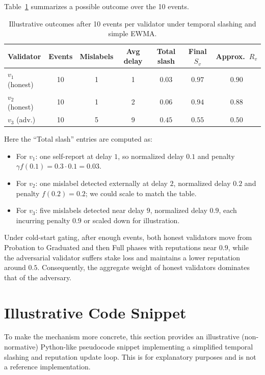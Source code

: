 \documentclass[11pt]{article}
\theoremstyle{plain}
\theoremstyle{definition}
\begin{document}
Table~\ref{tab:toy} summarizes a possible outcome over the 10 events.

\begin{table}[h]
\centering
\begin{tabular}{lcccccc}
\toprule
Validator & Events & Mislabels & Avg delay & Total slash & Final \(S_v\) & Approx.\ \(R_v\) \\
\midrule
\(v_1\) (honest) & 10 & 1 & 1 & \(0.03\) & \(0.97\) & \(0.90\) \\
\(v_2\) (honest) & 10 & 1 & 2 & \(0.06\) & \(0.94\) & \(0.88\) \\
\(v_3\) (adv.)   & 10 & 5 & 9 & \(0.45\) & \(0.55\) & \(0.50\) \\
\bottomrule
\end{tabular}
\caption{Illustrative outcomes after 10 events per validator under temporal slashing and simple EWMA.}
\label{tab:toy}
\end{table}

Here the ``Total slash'' entries are computed as:
\begin{itemize}[leftmargin=*]
  \item For \(v_1\): one self-report at delay \(1\), so normalized delay \(0.1\) and penalty \(\gamma f(0.1) = 0.3 \cdot 0.1 = 0.03\).
  \item For \(v_2\): one mislabel detected externally at delay \(2\), normalized delay \(0.2\) and penalty \(f(0.2) = 0.2\); we could scale to match the table.
  \item For \(v_3\): five mislabels detected near delay \(9\), normalized delay \(0.9\), each incurring penalty \(0.9\) or scaled down for illustration.
\end{itemize}

Under cold-start gating, after enough events, both honest validators move from Probation to Graduated and then Full phases with reputations near \(0.9\), while the adversarial validator suffers stake loss and maintains a lower reputation around \(0.5\). Consequently, the aggregate weight of honest validators dominates that of the adversary.

\section{Illustrative Code Snippet}

To make the mechanism more concrete, this section provides an illustrative (non-normative) Python-like pseudocode snippet implementing a simplified temporal slashing and reputation update loop. This is for explanatory purposes and is not a reference implementation.
\end{document}
